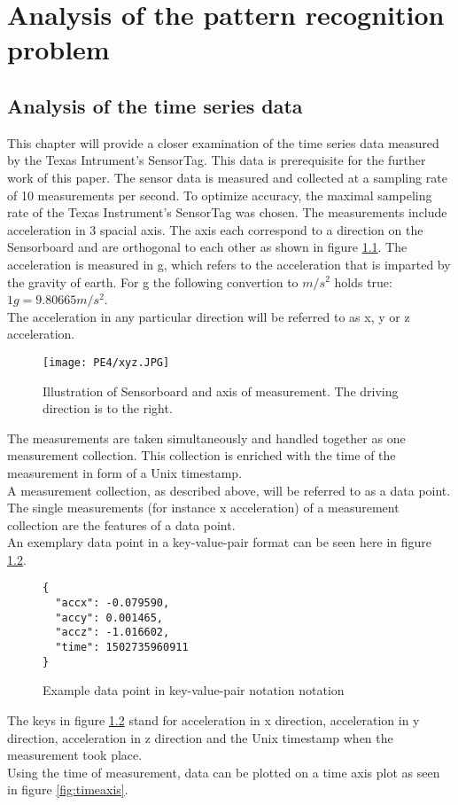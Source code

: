 \chapter{Analysis of the pattern recognition problem}
\label{ch:Analysis of the pattern recognition problem}

\section{Analysis of the time series data}
\label{sec:Analysis of the time series data}
This chapter will provide a closer examination of the time series data measured by the Texas Intrument's SensorTag. This data is prerequisite for the further work of this paper. \newline
The sensor data is measured and collected at a sampling rate of 10 measurements per second. To optimize accuracy, the maximal sampeling rate of the Texas Instrument's SensorTag was chosen.  The measurements include acceleration in 3 spacial axis. The axis each correspond to a direction on the Sensorboard and are orthogonal to each other as shown in figure \ref{fig:xyzboard}. The acceleration is measured in g, which refers to the acceleration that is imparted by the gravity of earth. For g the following convertion to  $m/s^2 $ holds true: $ 1 g = 9.80665 m/s^2 $. 
\\
The acceleration in any particular direction will be referred to as x, y or z acceleration.\cite{techdocu}

\begin{figure}[h]
\centering
\texttt{[image: PE4/xyz.JPG]}
\caption{Illustration of Sensorboard and axis of measurement. The driving direction is to the right.}
\label{fig:xyzboard}
\end{figure}


The measurements are taken  simultaneously and handled together as one measurement collection. This collection is enriched with the time of the measurement  in form of a Unix timestamp.\\
A measurement collection, as described above, will be referred to as a data point. The single measurements (for instance x acceleration) of a measurement collection are the features of a data point.\\
An exemplary data point in a key-value-pair format can be seen here in figure \ref{fig:datapointjson}.
\begin{figure}[h]
\centering
\begin{lstlisting}
{
  "accx": -0.079590,
  "accy": 0.001465,
  "accz": -1.016602,
  "time": 1502735960911
}
\end{lstlisting}
\caption{Example data point in key-value-pair notation notation}
\label{fig:datapointjson}
\end{figure}
The keys in figure \ref{fig:datapointjson} stand for acceleration in x direction, acceleration in y direction, acceleration in z direction and the Unix timestamp when the measurement took place. \\
Using the time of measurement, data can be plotted on a time axis plot as seen in figure \ref{fig:timeaxis}.


